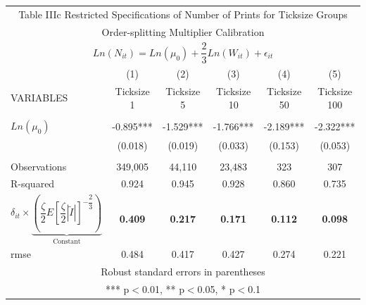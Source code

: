 \documentclass[12pt,a4paper]{article}
\begin{document}
\newpage
\begin{landscape}
\begin{table}
\begin{center}
\begin{tabular}{lccccc}
\multicolumn{6}{c}{Table IIIc Restricted Specifications of Number of Prints for Ticksize Groups} \\ 
\multicolumn{6}{c}{Order-splitting Multiplier Calibration} \\
\hline
\multicolumn{6}{c}{$Ln(N_{it}) = Ln(\mu_{0}) + \dfrac{2}{3} Ln(W_{it}) + \epsilon_{it}$} \\
 & (1) & (2) & (3) & (4) & (5) \\
VARIABLES & Ticksize 1 & Ticksize 5 & Ticksize 10 & Ticksize 50 & Ticksize 100 \\ \hline
 &  &  &  &  &  \\
$Ln(\mu_{0})$ & -0.895*** & -1.529*** & -1.766*** & -2.189*** & -2.322*** \\
 & (0.018) & (0.019) & (0.033) & (0.153) & (0.053) \\
 &  &  &  &  &  \\
Observations & 349,005 & 44,110 & 23,483 & 323 & 307 \\
R-squared & 0.924 & 0.945 & 0.928 & 0.860 & 0.735 \\
$\delta_{it}\times \underbrace{(\dfrac{\zeta}{2}E[\dfrac{\zeta}{2}|\tilde{I}|]^{-\dfrac{2}{3}})}_{\text{Constant}}$ & \textbf{0.409} & \textbf{0.217} & \textbf{0.171} & \textbf{0.112} & \textbf{0.098} \\
 rmse & 0.484 & 0.417 & 0.427 & 0.274 & 0.221 \\ \hline
\multicolumn{6}{c}{ Robust standard errors in parentheses} \\
\multicolumn{6}{c}{ *** p$<$0.01, ** p$<$0.05, * p$<$0.1} \\
\end{tabular}

\end{center}
\end{table}
\end{landscape}
\end{document}
